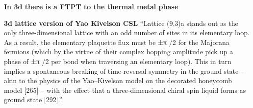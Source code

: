 \textbf{In 3d there is a FTPT to the thermal metal phase}

\textbf{3d lattice version of Yao Kivelson CSL} ``Lattice (9,3)a stands out as the only three-dimensional lattice with an odd number of sites in its elementary loop. As a result, the elementary plaquette flux must be ±π /2 for the Majorana fermions (which by the virtue of their complex hopping amplitude pick up a phase of ±π /2 per bond when traversing an elementary loop). This in turn implies a spontaneous breaking of time-reversal symmetry in the ground state -- akin to the physics of the Yao--Kivelson model on the decorated honeycomb model {[}265{]} -- with the effect that a three-dimensional chiral spin liquid forms as ground state {[}292{]}.''
